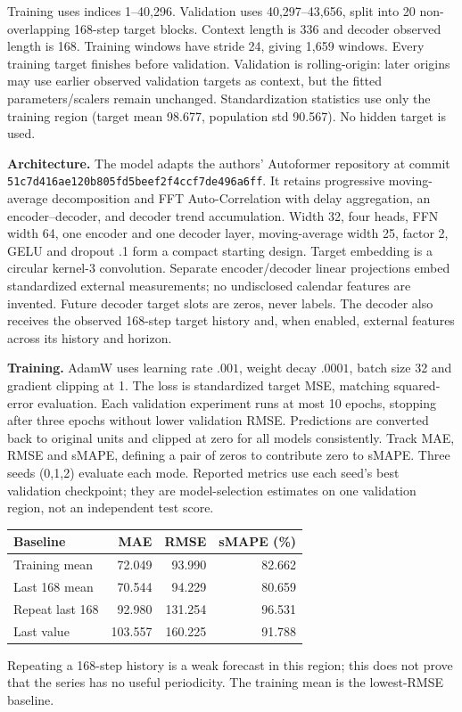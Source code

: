 \documentclass[10pt,a4paper]{article}
\begin{document}
Training uses indices 1--40,296. Validation uses 40,297--43,656, split into 20 non-overlapping 168-step target blocks. Context length is 336 and decoder observed length is 168. Training windows have stride 24, giving 1,659 windows. Every training target finishes before validation. Validation is rolling-origin: later origins may use earlier observed validation targets as context, but the fitted parameters/scalers remain unchanged. Standardization statistics use only the training region (target mean 98.677, population std 90.567). No hidden target is used.

\textbf{Architecture.} The model adapts the authors' Autoformer repository at commit\\{\small\texttt{51c7d416ae120b805fd5beef2f4ccf7de496a6ff}}.  It retains progressive moving-average decomposition and FFT Auto-Correlation with delay aggregation, an encoder--decoder, and decoder trend accumulation. Width 32, four heads, FFN width 64, one encoder and one decoder layer, moving-average width 25, factor 2, GELU and dropout .1 form a compact starting design. Target embedding is a circular kernel-3 convolution. Separate encoder/decoder linear projections embed standardized external measurements; no undisclosed calendar features are invented. Future decoder target slots are zeros, never labels. The decoder also receives the observed 168-step target history and, when enabled, external features across its history and horizon.

\textbf{Training.} AdamW uses learning rate $.001$, weight decay $.0001$, batch size 32 and gradient clipping at 1. The loss is standardized target MSE, matching squared-error evaluation. Each validation experiment runs at most 10 epochs, stopping after three epochs without lower validation RMSE. Predictions are converted back to original units and clipped at zero for all models consistently. Track MAE, RMSE and sMAPE, defining a pair of zeros to contribute zero to sMAPE. Three seeds (0,1,2) evaluate each mode. Reported metrics use each seed's best validation checkpoint; they are model-selection estimates on one validation region, not an independent test score.

\begin{center}\small
\begin{tabular}{lrrr}\toprule
Baseline & MAE & RMSE & sMAPE (\%)\\\midrule
Training mean & 72.049 & 93.990 & 82.662\\
Last 168 mean & 70.544 & 94.229 & 80.659\\
Repeat last 168 & 92.980 & 131.254 & 96.531\\
Last value & 103.557 & 160.225 & 91.788\\\bottomrule
\end{tabular}\end{center}
Repeating a 168-step history is a weak forecast in this region; this does not prove that the series has no useful periodicity. The training mean is the lowest-RMSE baseline.
\end{document}
